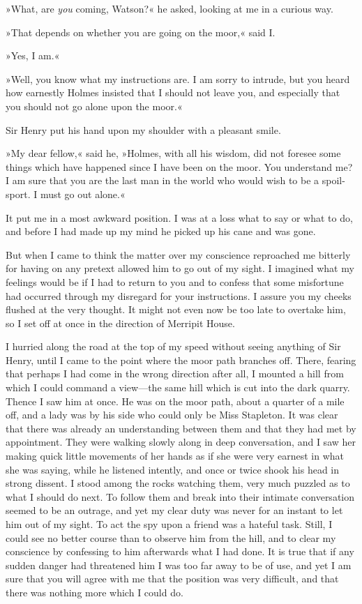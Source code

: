 »What, are \emph{you} coming, Watson?« he asked, looking at me in a curious way.

»That depends on whether you are going on the moor,« said I.

»Yes, I am.«

»Well, you know what my instructions are. I am sorry to intrude, but you heard how earnestly Holmes insisted that I should not leave you, and especially that you should not go alone upon the moor.«

Sir Henry put his hand upon my shoulder with a pleasant smile.

»My dear fellow,« said he, »Holmes, with all his wisdom, did not foresee some things which have happened since I have been on the moor. You understand me? I am sure that you are the last man in the world who would wish to be a spoil-sport. I must go out alone.«

It put me in a most awkward position. I was at a loss what to say or what to do, and before I had made up my mind he picked up his cane and was gone.

But when I came to think the matter over my conscience reproached me bitterly for having on any pretext allowed him to go out of my sight. I imagined what my feelings would be if I had to return to you and to confess that some misfortune had occurred through my disregard for your instructions. I assure you my cheeks flushed at the very thought. It might not even now be too late to overtake him, so I set off at once in the direction of Merripit House.

I hurried along the road at the top of my speed without seeing anything of Sir Henry, until I came to the point where the moor path branches off. There, fearing that perhaps I had come in the wrong direction after all, I mounted a hill from which I could command a view—the same hill which is cut into the dark quarry. Thence I saw him at once. He was on the moor path, about a quarter of a mile off, and a lady was by his side who could only be Miss Stapleton. It was clear that there was already an understanding between them and that they had met by appointment. They were walking slowly along in deep conversation, and I saw her making quick little movements of her hands as if she were very earnest in what she was saying, while he listened intently, and once or twice shook his head in strong dissent. I stood among the rocks watching them, very much puzzled as to what I should do next. To follow them and break into their intimate conversation seemed to be an outrage, and yet my clear duty was never for an instant to let him out of my sight. To act the spy upon a friend was a hateful task. Still, I could see no better course than to observe him from the hill, and to clear my conscience by confessing to him afterwards what I had done. It is true that if any sudden danger had threatened him I was too far away to be of use, and yet I am sure that you will agree with me that the position was very difficult, and that there was nothing more which I could do.


